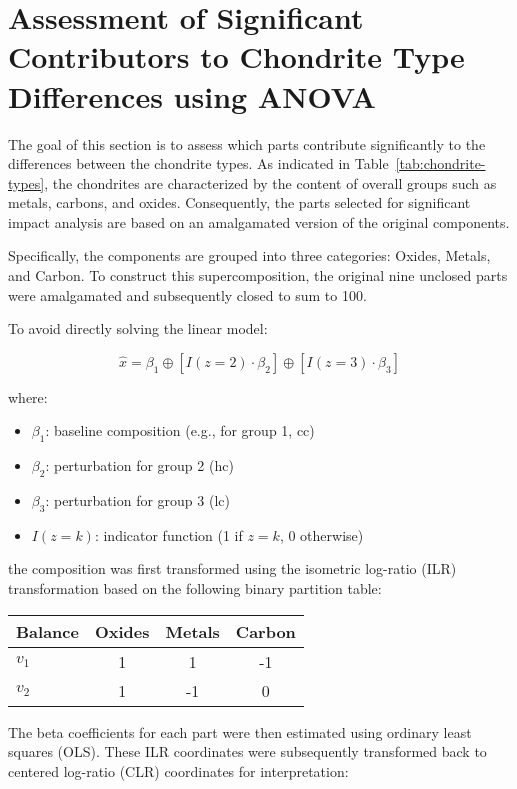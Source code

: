 
\section{Assessment of Significant Contributors to Chondrite Type Differences using ANOVA}

The goal of this section is to assess which parts contribute significantly to the differences between the chondrite types. As indicated in Table~\ref{tab:chondrite-types}, the chondrites are characterized by the content of overall groups such as metals, carbons, and oxides. Consequently, the parts selected for significant impact analysis are based on an amalgamated version of the original components.

Specifically, the components are grouped into three categories: Oxides, Metals, and Carbon. To construct this supercomposition, the original nine unclosed parts were amalgamated and subsequently closed to sum to 100.

To avoid directly solving the linear model:

\[
\hat{x} = \beta_1 \oplus \left[ I(z = 2) \cdot \beta_2 \right] \oplus \left[ I(z = 3) \cdot \beta_3 \right]
\]

\noindent where:
\begin{itemize}
    \item \( \beta_1 \): baseline composition (e.g., for group 1, cc)
    \item \( \beta_2 \): perturbation for group 2 (hc)
    \item \( \beta_3 \): perturbation for group 3 (lc)
    \item \( I(z = k) \): indicator function (1 if \( z = k \), 0 otherwise)
\end{itemize}

the composition was first transformed using the isometric log-ratio (ILR) transformation based on the following binary partition table:

\begin{table}[h!]
\centering
\begin{tabular}{lccc}
\textbf{Balance} & Oxides & Metals & Carbon \\
\midrule
$v_1$  & 1  & 1  & -1 \\
$v_2$  & 1  & -1 & 0  \\
\end{tabular}
\end{table}

The beta coefficients for each part were then estimated using ordinary least squares (OLS). These ILR coordinates were subsequently transformed back to centered log-ratio (CLR) coordinates for interpretation:

